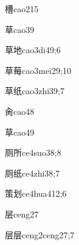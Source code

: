 \begin{verbete}{槽}{cao2}{15}
\end{verbete}

\begin{verbete}{草}{cao3}{9}
\end{verbete}

\begin{verbete}{草地}{cao3di4}{9;6}
\end{verbete}

\begin{verbete}{草莓}{cao3mei2}{9;10}
\end{verbete}

\begin{verbete}{草纸}{cao3zhi3}{9;7}
\end{verbete}

\begin{verbete}{肏}{cao4}{8}
\end{verbete}

\begin{verbete}{草}{cao4}{9}
\end{verbete}

\begin{verbete}{厕所}{ce4suo3}{8;8}
\end{verbete}

\begin{verbete}{厕纸}{ce4zhi3}{8;7}
\end{verbete}

\begin{verbete}{策划}{ce4hua4}{12;6}
\end{verbete}

\begin{verbete}{层}{ceng2}{7}
\end{verbete}

\begin{verbete}{层层}{ceng2ceng2}{7;7}
\end{verbete}

